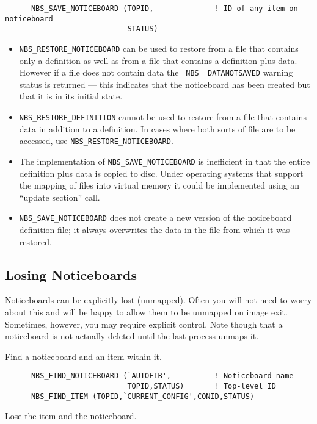 \begin {verbatim}
      NBS_SAVE_NOTICEBOARD (TOPID,              ! ID of any item on noticeboard
                            STATUS)
\end{verbatim}

\begin {itemize}
\item {\tt NBS\_RESTORE\_NOTICEBOARD} can be used to restore from a file
that contains only a definition as well as from a file that contains a
definition plus data. However if a file does not contain data the {\tt
NBS\_\_DATANOTSAVED} warning status is returned --- this indicates that the
noticeboard has been created but that it is in its initial state.
\item {\tt NBS\_RESTORE\_DEFINITION} cannot be used to restore from a file
that contains data in addition to a definition. In cases where both sorts
of file are to be accessed, use {\tt NBS\_RESTORE\_NOTICEBOARD}.
\item The implementation of {\tt NBS\_SAVE\_NOTICEBOARD} is inefficient
in that the entire definition plus data is copied to disc. Under operating
systems that support the mapping of files into virtual memory it could be
implemented using an ``update section'' call.
\item {\tt NBS\_SAVE\_NOTICEBOARD} does not create a new version of the
noticeboard definition file; it always overwrites the data in the file from
which it was restored.
\end {itemize}

\subsection {Losing Noticeboards}

Noticeboards can be explicitly lost (unmapped). Often you will not need to
worry about this and will be happy to allow them to be unmapped on image exit.
Sometimes, however, you may require explicit control. Note though that a
noticeboard is not actually deleted until the last process unmaps it.

Find a noticeboard and an item within it.

\begin{verbatim}
      NBS_FIND_NOTICEBOARD (`AUTOFIB',          ! Noticeboard name
                            TOPID,STATUS)       ! Top-level ID
      NBS_FIND_ITEM (TOPID,`CURRENT_CONFIG',CONID,STATUS)
\end{verbatim}

Lose the item and the noticeboard.

